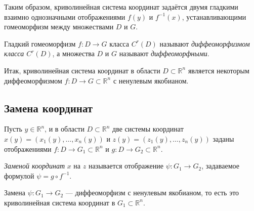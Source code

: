 Таким образом, криволинейная система координат задаётся двумя гладкими взаимно
однозначными отображениями $f(y)$ и $f^{-1}(x)$, устанавливающими гомеоморфизм
между множествами $D$ и $G$.

\begin{definition}
  Гладкий гомеоморфизм $f : D \to G$ класса $C^r(D)$ называют
  \textit{диффеоморфизмом класса $C^r(D)$}, а множества $D$ и $G$ называют
  \textit{диффеоморфными}.
\end{definition}

Итак, криволинейная система координат в области $D \subset \mathbb{R}^n$
является некоторым диффеоморфизмом $f : D \to G \subset \mathbb{R}^n$ с
ненулевым якобианом.

\subsection{Замена координат}

Пусть $y \in \mathbb{R}^n$, и в области $D \subset \mathbb{R}^n$ две системы
координат $x(y) = (x_1(y), \dots, x_n(y))$ и $z(y) = (z_1(y), \dots, z_n(y))$
заданы отображениями $f : D \to G_1 \subset \mathbb{R}^n$ и
$g : D \to G_2 \subset \mathbb{R}^n$.

\begin{definition}
  \textit{Заменой координат} $x$ на $z$ называется отображение
  $\psi : G_1 \to G_2$, задаваемое формулой $\psi = g \circ f^{-1}$.
\end{definition}

\begin{remark}
  Замена $\psi : G_1 \to G_2$ --- диффеоморфизм с ненулевым якобианом, то есть
  это криволинейная система координат в $G_1 \subset \mathbb{R}^n$.
\end{remark}

